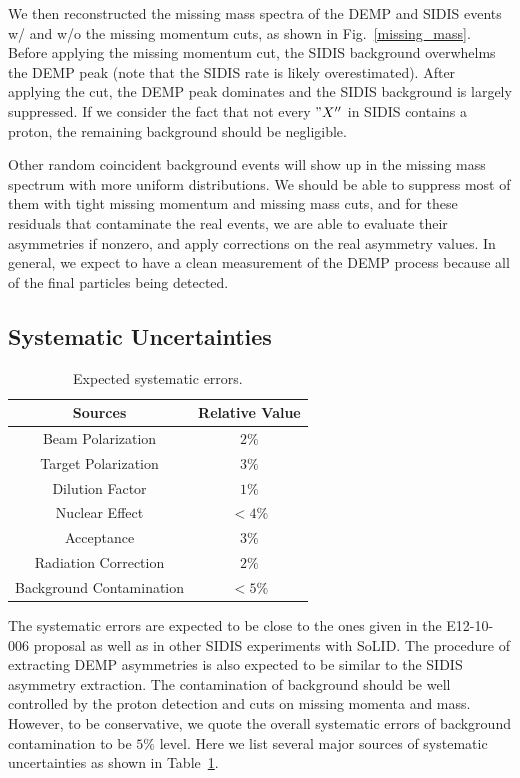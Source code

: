 We then reconstructed the missing mass spectra of the DEMP and SIDIS events w/
and w/o the missing momentum cuts, as shown in Fig.~\ref{missing_mass}. Before
applying the missing momentum cut, the SIDIS background overwhelms the DEMP
peak (note that the SIDIS rate is likely overestimated). After applying the
cut, the DEMP peak dominates and the SIDIS background is largely suppressed. If
we consider the fact that not every $"X''$ in SIDIS contains a proton, the
remaining background should be negligible.

Other random coincident background events will show up in the missing mass
spectrum with more uniform distributions. We should be able to suppress most of
them with tight missing momentum and missing mass cuts, and for these residuals
that contaminate the real events, we are able to evaluate their asymmetries if
nonzero, and apply corrections on the real asymmetry values. In general, we
expect to have a clean measurement of the DEMP process because all of the final
particles being detected.

\subsection{Systematic Uncertainties}

\begin{table}[!htp]
\centering
\begin{tabular}{|c|c|}
\hline
{\bf Sources}            & {\bf Relative Value} \\\hline
Beam Polarization        & $2\%$ \\\hline 
Target Polarization      & $3\%$ \\\hline 
Dilution Factor          & $1\%$ \\\hline 
Nuclear Effect           & $<4\%$ \\\hline 
Acceptance               & $3\%$ \\\hline
Radiation Correction     & $2\%$ \\\hline
Background Contamination & $<5\%$ \\\hline
\end{tabular}
\caption{\footnotesize{Expected systematic errors.}}\label{table:det_sys_err}
\end{table}

The systematic errors are expected to be close to the ones given in the
E12-10-006 proposal as well as in other SIDIS experiments with SoLID. The
procedure of extracting DEMP asymmetries is also expected to be similar to the
SIDIS asymmetry extraction.  The contamination of background should be well
controlled by the proton detection and cuts on missing momenta and mass.
However, to be conservative, we quote the overall systematic errors of
background contamination to be $5\%$ level.  Here we list several major sources
of systematic uncertainties as shown in Table~\ref{table:det_sys_err}.

